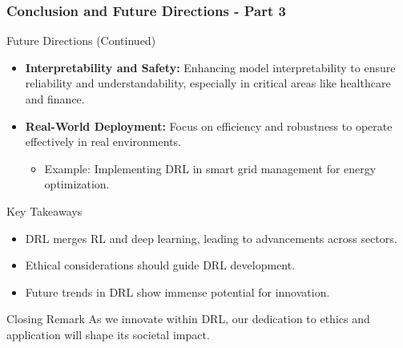 \documentclass[aspectratio=169]{beamer}
\begin{document}
\begin{frame}[fragile]
  \frametitle{Conclusion and Future Directions - Part 3}
  \begin{block}{Future Directions (Continued)}
    \begin{itemize}
      \item \textbf{Interpretability and Safety:} Enhancing model interpretability to ensure reliability and understandability, especially in critical areas like healthcare and finance.
      \item \textbf{Real-World Deployment:} Focus on efficiency and robustness to operate effectively in real environments.
        \begin{itemize}
          \item Example: Implementing DRL in smart grid management for energy optimization.
        \end{itemize}
    \end{itemize}
  \end{block}

  \begin{block}{Key Takeaways}
    \begin{itemize}
      \item DRL merges RL and deep learning, leading to advancements across sectors.
      \item Ethical considerations should guide DRL development.
      \item Future trends in DRL show immense potential for innovation.
    \end{itemize}
  \end{block}

  \begin{block}{Closing Remark}
    As we innovate within DRL, our dedication to ethics and application will shape its societal impact.
  \end{block}
\end{frame}
\end{document}

